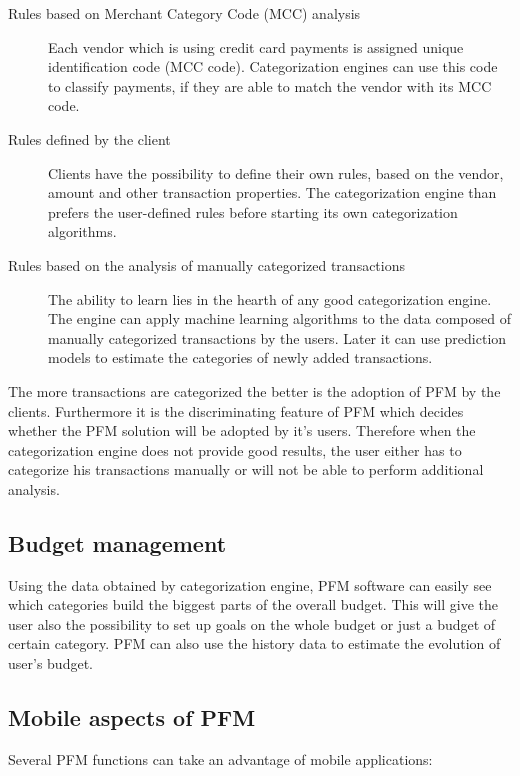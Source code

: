 \begin{description}
	\item [Rules based on Merchant Category Code (MCC) analysis]
	Each vendor which is using credit card payments is assigned unique identification code (MCC code). Categorization engines can use this code to classify payments, if they are able to match the vendor with its MCC code.
	\item [Rules defined by the client]
	
	Clients have the possibility to define their own rules, based on the vendor, amount and other transaction properties. The categorization engine than prefers the user-defined rules before starting its own categorization algorithms.
	
	\item [Rules based on the analysis of manually categorized transactions]
	
	The ability to learn lies in the hearth of any good categorization engine. The engine can apply machine learning algorithms to the data composed of manually categorized transactions by the users. Later it can use prediction models to estimate the categories of newly added transactions.
	
\end{description}

The more transactions are categorized the better is the adoption of PFM by the clients. Furthermore it is the discriminating feature of PFM which decides whether the PFM solution will be adopted by it's users. Therefore when the categorization engine does not provide good results, the user either has to categorize his transactions manually or will not be able to perform additional analysis.

\subsection{Budget management}
Using the data obtained by categorization engine, PFM software can easily see which categories build the biggest parts of the overall budget. This will give the user also the possibility to set up goals on the whole budget or just a budget of certain category. PFM can also use the history data to estimate the evolution of user's budget.

\subsection{Mobile aspects of PFM}
Several PFM functions can take an advantage of mobile applications:


